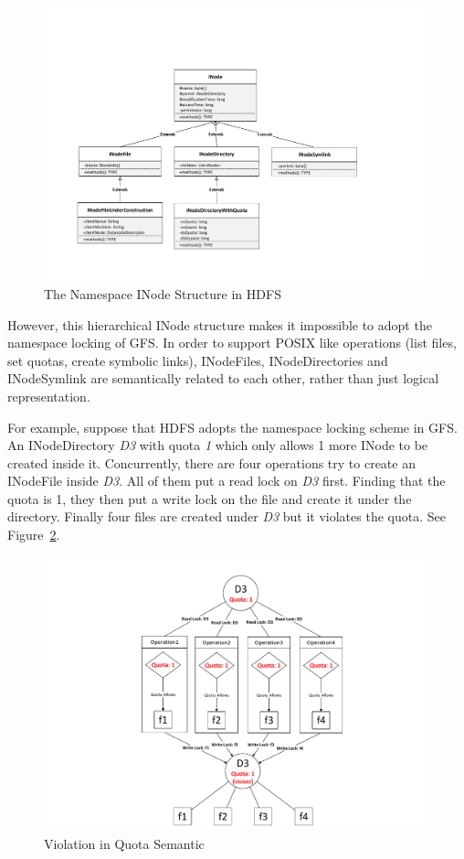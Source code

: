 \begin{figure}[ht]
	\centering
	\includegraphics[width=\linewidth]{figs/INodeUML.pdf}
	\caption{The Namespace INode Structure in HDFS}
	\label{fig:inodeuml}
\end{figure}

\noindent However, this hierarchical INode structure makes it impossible to adopt the namespace locking of GFS. In order to support POSIX like operations (list files, set quotas, create symbolic links), INodeFiles, INodeDirectories and INodeSymlink are semantically related to each other, rather than just logical representation.

\noindent For example, suppose that HDFS adopts the namespace locking scheme in GFS. An INodeDirectory \textit{D3} with quota \textit{1} which only allows 1 more INode to be created inside it. Concurrently, there are four operations try to create an INodeFile inside \textit{D3}. All of them put a read lock on \textit{D3} first. Finding that the quota is 1, they then put a write lock on the file and create it under the directory. Finally four files are created under \textit{D3} but it violates the quota. See Figure~\ref{fig:hdfsquota}.

\begin{figure}[ht]
	\centering
	\includegraphics[scale=0.8]{figs/hdfsquota.pdf}
	\caption{Violation in Quota Semantic}
	\label{fig:hdfsquota}
\end{figure}

